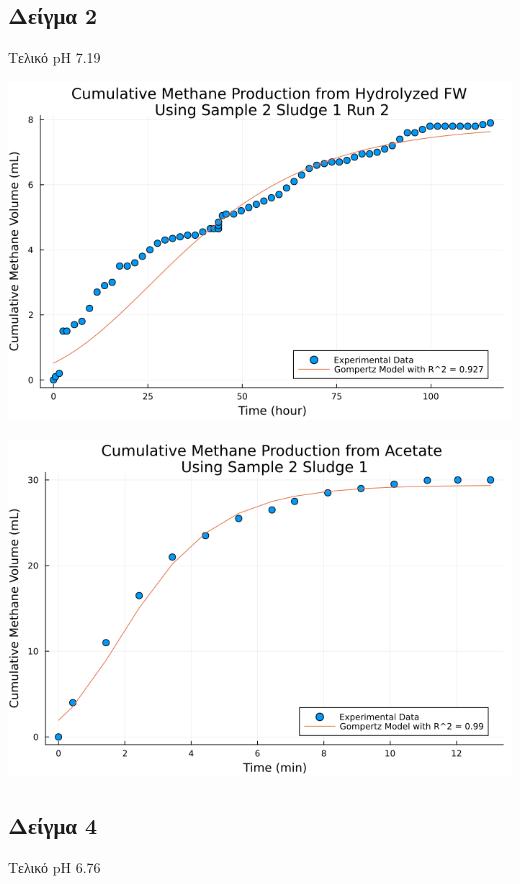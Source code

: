 \documentclass[11pt]{article}
\begin{document}
\subsection{Δείγμα 2}
\label{sec:org404c9f3}
Τελικό pH 7.19

\begin{center}
\includegraphics[width=.9\linewidth]{../plots/BMPs/Hydrolyzed FW/methane_kinetics_hydrolysate_2_s1_r2_hour.png}
\end{center}

\begin{center}
\includegraphics[width=.9\linewidth]{../plots/BMPs/Acetate/methane_kinetics_acet_test_2_s1_min.png}
\end{center}

\subsection{Δείγμα 4}
\label{sec:org1c9e04f}
Τελικό pH 6.76
\end{document}
